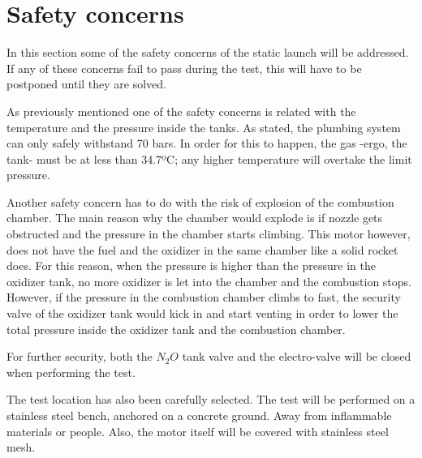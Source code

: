 
\section*{Safety concerns}

In this section some of the safety concerns of the static launch will be addressed. If any of these concerns fail to pass during the test, this will have to be postponed until they are solved.

As previously mentioned one of the safety concerns is related with the temperature and the pressure inside the tanks. As stated, the plumbing system can only safely withstand 70 bars. In order for this to happen, the gas -ergo, the tank- must be at less than 34.7ºC; any higher temperature will overtake the limit pressure.

Another safety concern has to do with the risk of explosion of the combustion chamber. The main reason why the chamber would explode is if nozzle gets obstructed and the pressure in the chamber starts climbing. This motor however, does not have the fuel and the oxidizer in the same chamber like a solid rocket does. For this reason, when the pressure is higher than the pressure in the oxidizer tank, no more oxidizer is let into the chamber and the combustion stops. However, if the pressure in the combustion chamber climbs to fast, the security valve of the oxidizer tank would kick in and start venting in order to lower the total pressure inside the oxidizer tank and the combustion chamber.

For further security, both the $N_2O$ tank valve and the electro-valve will be closed when performing the test.

The test location has also been carefully selected. The test will be performed on a stainless steel bench, anchored on a concrete ground. Away from inflammable materials or people. Also, the motor itself will be covered with stainless steel mesh.
